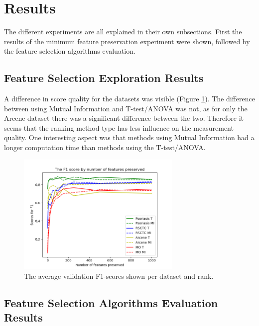 \documentclass[10pt,a4paper]{report}
\begin{document}
	\section{Results}
	\label{FSsec:Results}
	
	The different experiments are all explained in their own subsections. First the results of the minimum feature preservation experiment were shown, followed by the feature selection algorithms evaluation.
	
	\subsection{Feature Selection Exploration Results}
	\label{FSsubsec:FeatureReductionExplorationResults}
	
	A difference in score quality for the datasets was visible (Figure \ref{fig:DatasetRankF1Scores}). The difference between using Mutual Information and T-test/ANOVA was not, as for only the Arcene dataset there was a significant difference between the two. Therefore it seems that the ranking method type has less influence on the measurement quality. One interesting aspect was that methods using Mutual Information had a longer computation time than methods using the T-test/ANOVA.
		
	\begin{figure}[H]
		\includegraphics[width=0.7\textwidth]{Data_Rank_F1_Scores.png}
		\caption{The average validation F1-scores shown per dataset and rank.}
		\label{fig:DatasetRankF1Scores}
	\end{figure}
	
	\subsection{Feature Selection Algorithms Evaluation Results}
	\label{FSsubsec:FeatureSelectionAlgorithmsEvaluationResults}
	
\end{document}
